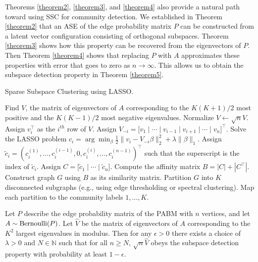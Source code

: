 \documentclass[12pt]{article}
\begin{document}
Theorems \ref{theorem2}, \ref{theorem3}, and \ref{theorem4} also provide
a natural path toward using SSC for community detection. 
We established in Theorem \ref{theorem2} that an ASE of the edge
probability matrix \(P\) can be constructed from a latent vector configuration 
consisting of orthogonal subspaces. Theorem \ref{theorem3} shows how 
this property can be recovered from the eigenvectors of \(P\). 
Then Theorem \ref{theorem4} shows that replacing $P$ with $A$ 
approximates these properties with error that goes to zero as \(n \to \infty\). 
This allows us to obtain the subspace detection property 
in Theorem \ref{theorem5}. 

\begin{algorithm}[t]
  \label{alg:ssc}
  \DontPrintSemicolon
  \SetAlgoLined
  \caption{Sparse Subspace Clustering using LASSO.}
    Find $V$, the matrix of eigenvectors of $A$
    corresponding to the $K (K + 1) / 2$ most positive
    and the $K (K - 1) / 2$ most negative eigenvalues.\;
    Normalize $V \leftarrow \sqrt{n} V$.\;
     {
      Assign $v_i^\top$ as the $i^{th}$ row of $V$.
      Assign $V_{-i} = \bigl[
      v_1 \mid \cdots \mid v_{i-1} \mid v_{i+1} \mid \cdots \mid v_n \bigr]^\top$.\;
      Solve the LASSO problem
      $c_i = \arg\min_{\beta}
      \frac{1}{2} \|v_i - V_{-i} \beta\|_2^2 + \lambda \|\beta\|_1$.\;
      Assign $\tilde{c}_i = (c_i^{(1)}, \dots, c_i^{(i-1)}, 0, c_i^{(i)}, \dots, c_i^{(n-1)})^\top$ such that the superscript is the index of
      $\tilde{c}_i$.\;
    }
    Assign
    $C = \bigr[ \tilde{c}_1 \mid \cdots \mid \tilde{c}_n \bigr]$.\;
    Compute the affinity matrix $B = |C| + |C^\top|$.\;
    Construct graph $G$ using $B$ as its similarity matrix.\;
    Partition $G$ into $K$ disconnected subgraphs (e.g., using edge
    thresholding or spectral clustering).\;
    Map each partition to the community labels $1, ..., K$.
\end{algorithm}

\begin{theorem}
\label{theorem5}
Let $P$ describe the edge probability matrix of the PABM with
$n$ vertices, and let $A \sim \mathrm{Bernoulli}(P)$.  Let $\hat{V}$ be the
matrix of eigenvectors of $A$ corresponding to the $K^2$ largest
eigenvalues in modulus. Then for any $\epsilon > 0$ 
there exists a choice of $\lambda > 0$ and $N \in \mathbb{N}$ such
that for all $n \geq N$, $\sqrt{n} \hat{V}$ obeys the subspace detection property with
probability at least $1 - \epsilon$.  
\end{theorem}
\end{document}
